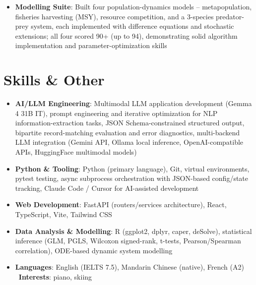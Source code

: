\documentclass{my-resume}
\begin{document}
\begin{itemize}[parsep=0.2ex]
  \item \textbf{Modelling Suite}: Built four population-dynamics models -- metapopulation, fisheries harvesting (MSY), resource competition, and a 3-species predator-prey system, each implemented with difference equations and stochastic extensions; all four scored 90+ (up to 94), demonstrating solid algorithm implementation and parameter-optimization skills
\end{itemize}

\section{Skills \& Other}
\entrySkillsSep
\begin{itemize}[parsep=0.2ex]
  \item \textbf{AI/LLM Engineering}: Multimodal LLM application development (Gemma 4 31B IT), prompt engineering and iterative optimization for NLP information-extraction tasks, JSON Schema-constrained structured output, bipartite record-matching evaluation and error diagnostics, multi-backend LLM integration (Gemini API, Ollama local inference, OpenAI-compatible APIs, HuggingFace multimodal models)
  \item \textbf{Python \& Tooling}: Python (primary language), Git, virtual environments, pytest testing, async subprocess orchestration with JSON-based config/state tracking, Claude Code / Cursor for AI-assisted development
  \item \textbf{Web Development}: FastAPI (routers/services architecture), React, TypeScript, Vite, Tailwind CSS
  \item \textbf{Data Analysis \& Modelling}: R (ggplot2, dplyr, caper, deSolve), statistical inference (GLM, PGLS, Wilcoxon signed-rank, t-tests, Pearson/Spearman correlation), ODE-based dynamic system modelling
  \item \textbf{Languages}: English (IELTS 7.5), Mandarin Chinese (native), French (A2) \textbar\ \textbf{Interests}: piano, skiing
\end{itemize}
\end{document}
